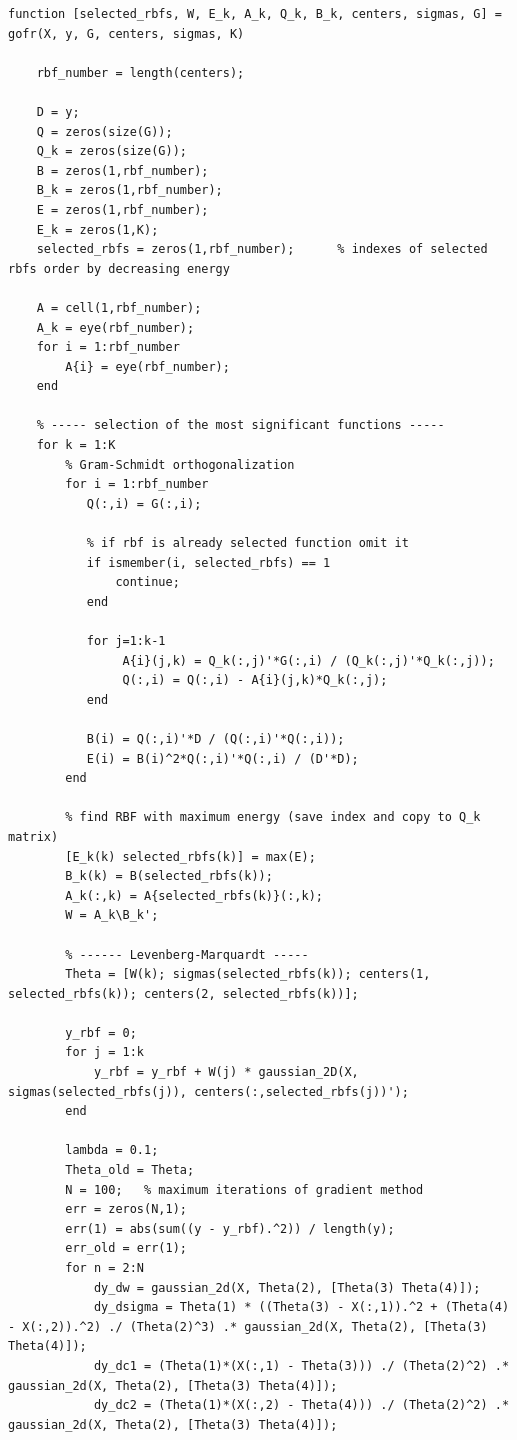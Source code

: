 \begin{lstlisting}
function [selected_rbfs, W, E_k, A_k, Q_k, B_k, centers, sigmas, G] =  gofr(X, y, G, centers, sigmas, K)

    rbf_number = length(centers);

    D = y;
    Q = zeros(size(G));
    Q_k = zeros(size(G));
    B = zeros(1,rbf_number);
    B_k = zeros(1,rbf_number);
    E = zeros(1,rbf_number);
    E_k = zeros(1,K);
    selected_rbfs = zeros(1,rbf_number);      % indexes of selected rbfs order by decreasing energy 

    A = cell(1,rbf_number);
    A_k = eye(rbf_number);
    for i = 1:rbf_number
        A{i} = eye(rbf_number);
    end

    % ----- selection of the most significant functions -----
    for k = 1:K
        % Gram-Schmidt orthogonalization
        for i = 1:rbf_number
           Q(:,i) = G(:,i);

           % if rbf is already selected function omit it 
           if ismember(i, selected_rbfs) == 1
               continue;
           end

           for j=1:k-1
                A{i}(j,k) = Q_k(:,j)'*G(:,i) / (Q_k(:,j)'*Q_k(:,j));
                Q(:,i) = Q(:,i) - A{i}(j,k)*Q_k(:,j);
           end

           B(i) = Q(:,i)'*D / (Q(:,i)'*Q(:,i));
           E(i) = B(i)^2*Q(:,i)'*Q(:,i) / (D'*D);   
        end

        % find RBF with maximum energy (save index and copy to Q_k matrix)
        [E_k(k) selected_rbfs(k)] = max(E);
        B_k(k) = B(selected_rbfs(k));
        A_k(:,k) = A{selected_rbfs(k)}(:,k);
        W = A_k\B_k';

        % ------ Levenberg-Marquardt -----
        Theta = [W(k); sigmas(selected_rbfs(k)); centers(1, selected_rbfs(k)); centers(2, selected_rbfs(k))];

        y_rbf = 0;
        for j = 1:k
            y_rbf = y_rbf + W(j) * gaussian_2D(X, sigmas(selected_rbfs(j)), centers(:,selected_rbfs(j))');
        end
        
        lambda = 0.1;
        Theta_old = Theta;
        N = 100;   % maximum iterations of gradient method
        err = zeros(N,1);
        err(1) = abs(sum((y - y_rbf).^2)) / length(y);
        err_old = err(1);
        for n = 2:N
            dy_dw = gaussian_2d(X, Theta(2), [Theta(3) Theta(4)]);
            dy_dsigma = Theta(1) * ((Theta(3) - X(:,1)).^2 + (Theta(4) - X(:,2)).^2) ./ (Theta(2)^3) .* gaussian_2d(X, Theta(2), [Theta(3) Theta(4)]);
            dy_dc1 = (Theta(1)*(X(:,1) - Theta(3))) ./ (Theta(2)^2) .* gaussian_2d(X, Theta(2), [Theta(3) Theta(4)]);
            dy_dc2 = (Theta(1)*(X(:,2) - Theta(4))) ./ (Theta(2)^2) .* gaussian_2d(X, Theta(2), [Theta(3) Theta(4)]);
            

\end{lstlisting}
